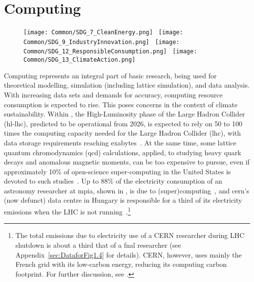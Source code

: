 \documentclass[../SustainableHEP.tex]{subfiles}
\begin{document}
\RaggedRight
\sloppy
\newpage


\section{Computing}
\label{sec:Computing}


\begin{figure}
\texttt{[image: Common/SDG\_7\_CleanEnergy.png]}~%
\texttt{[image: Common/SDG\_9\_IndustryInnovation.png]}~%
\texttt{[image: Common/SDG\_12\_ResponsibleConsumption.png]}~%
\texttt{[image: Common/SDG\_13\_ClimateAction.png]}
\end{figure}


\exSum

\noindent Computing represents an integral part of basic research, being used for theoretical modelling, simulation (including lattice simulation), and data analysis. With increasing data sets and demands for accuracy, computing resource consumption is expected to rise. 
This poses concerns in the context of climate sustainability. 
Within \ACR, \eg the High-Luminosity phase of the Large Hadron Collider (\acrshort{hl-lhc}), predicted to be operational from 2026, is expected to rely on 50 to 100 times the computing capacity needed for the Large Hadron Collider (\acrshort{lhc}), with data storage requirements reaching exabytes~\cite{CERN_computing_webpage}. 
At the same time, some lattice quantum chromodynamics  (\acrshort{qcd}) calculations, applied, \eg to studying heavy quark decays and anomalous magnetic moments, can be too expensive to pursue, even if approximately 10\% of open-science super-computing in the United States is devoted to such studies~\cite{Shanahan}.
Up to 88\% of the electricity consumption of an astronomy researcher at \acrshort{mpia}, shown in , is due to (super)computing~\cite{Jahnke2020}, and \acrshort{cern}'s (now defunct) data centre in Hungary is responsible for a third of its electricity emissions when the LHC is not running~\cite{Environment:2737239}.\footnote{The total emissions due to electricity use of a CERN researcher during LHC shutdown is about a third that of a \acrshort{fnal} researcher (see Appendix~\ref{sec:DataforFig1.4} for details). CERN, however, uses mainly the French grid with its low-carbon energy, reducing its computing carbon footprint. For further discussion, see .}
\end{document}
